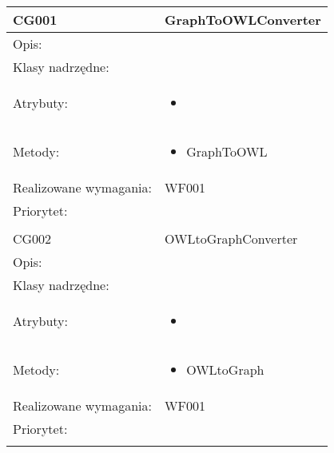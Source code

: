 \documentclass[a4paper,10pt]{article}
\begin{document}
\begin{center}
 


\begin{tabular}{|m{3cm}|m{9cm}|} \hline

CG001 & GraphToOWLConverter \\ \hline
Opis: &     \\ \hline
Klasy nadrzędne: &     \\ \hline
Atrybuty: & \begin{itemize}
 \item 
\end{itemize}
 \\ \hline
Metody: & \begin{itemize}
 \item GraphToOWL
\end{itemize}
  \\ \hline
Realizowane wymagania: & WF001 \\ \hline
Priorytet: &  \\ \hline

\multicolumn{2}{c}{} \\
 \hline

CG002 & OWLtoGraphConverter \\ \hline
Opis: &     \\ \hline
Klasy nadrzędne: &     \\ \hline
Atrybuty: & \begin{itemize}
 \item 
\end{itemize}
 \\ \hline
Metody: & \begin{itemize}
 \item OWLtoGraph
\end{itemize}
  \\ \hline
Realizowane wymagania: & WF001 \\ \hline
Priorytet: &  \\ \hline

\multicolumn{2}{c}{} \\
 \hline


\end{tabular}

\end{center}


\clearpage
{}
{}

\end{document}
